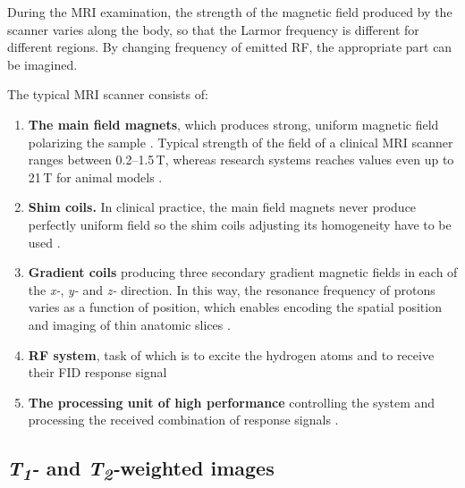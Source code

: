 During the MRI examination, the strength of the magnetic field produced by the scanner varies along the body, so that the Larmor frequency is different for different regions. By changing frequency of emitted RF, the appropriate part can be imagined. 

The typical MRI scanner consists of:
\begin{enumerate}
\item \textbf{The main field magnets}, which produces strong, uniform magnetic field polarizing the sample \cite{biomedical_hanbook_imaging}. Typical strength of the field of a clinical MRI scanner ranges between 0.2--1.5\,T, whereas research systems reaches values even up to 21\,T for animal models \cite{grover2015magnetic, sharma200821}.
\item \textbf{Shim coils.} In clinical practice, the main field magnets never produce perfectly uniform field so the shim coils adjusting its homogeneity have to be used \cite{biomedical_hanbook_imaging}.
\item \textbf{Gradient coils} producing three secondary gradient magnetic fields in each of the \textit{x-}, \textit{y-} and \textit{z-} direction. In this way, the resonance frequency of protons varies as a function of position, which enables encoding the spatial position and imaging of thin anatomic slices \cite{hidalgo2010theory}.
\item \textbf{RF system}, task of which is to excite the hydrogen atoms and to receive their FID response signal \cite{biomedical_hanbook_imaging}
\item \textbf{The processing unit of high performance} controlling the system and processing the received combination of response signals \cite{biomedical_hanbook_imaging}.
\end{enumerate}

\subsection{\textit{T\textsubscript{1}-} and \textit{T\textsubscript{2}-}weighted images}

